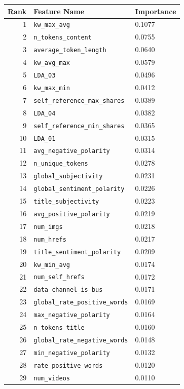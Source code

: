 \begin{longtable}{rll}
\toprule
\textbf{Rank} & \textbf{Feature Name} & \textbf{Importance} \\
\midrule
\endhead
1  & \texttt{kw\_max\_avg} & 0.1077 \\
2  & \texttt{n\_tokens\_content} & 0.0755 \\
3  & \texttt{average\_token\_length} & 0.0640 \\
4  & \texttt{kw\_avg\_max} & 0.0579 \\
5  & \texttt{LDA\_03} & 0.0496 \\
6  & \texttt{kw\_max\_min} & 0.0412 \\
7  & \texttt{self\_reference\_max\_shares} & 0.0389 \\
8  & \texttt{LDA\_04} & 0.0382 \\
9  & \texttt{self\_reference\_min\_shares} & 0.0365 \\
10 & \texttt{LDA\_01} & 0.0315 \\
11 & \texttt{avg\_negative\_polarity} & 0.0314 \\
12 & \texttt{n\_unique\_tokens} & 0.0278 \\
13 & \texttt{global\_subjectivity} & 0.0231 \\
14 & \texttt{global\_sentiment\_polarity} & 0.0226 \\
15 & \texttt{title\_subjectivity} & 0.0223 \\
16 & \texttt{avg\_positive\_polarity} & 0.0219 \\
17 & \texttt{num\_imgs} & 0.0218 \\
18 & \texttt{num\_hrefs} & 0.0217 \\
19 & \texttt{title\_sentiment\_polarity} & 0.0209 \\
20 & \texttt{kw\_min\_avg} & 0.0174 \\
21 & \texttt{num\_self\_hrefs} & 0.0172 \\
22 & \texttt{data\_channel\_is\_bus} & 0.0171 \\
23 & \texttt{global\_rate\_positive\_words} & 0.0169 \\
24 & \texttt{max\_negative\_polarity} & 0.0164 \\
25 & \texttt{n\_tokens\_title} & 0.0160 \\
26 & \texttt{global\_rate\_negative\_words} & 0.0148 \\
27 & \texttt{min\_negative\_polarity} & 0.0132 \\
28 & \texttt{rate\_positive\_words} & 0.0120 \\
29 & \texttt{num\_videos} & 0.0110 \\
\bottomrule
\end{longtable}

